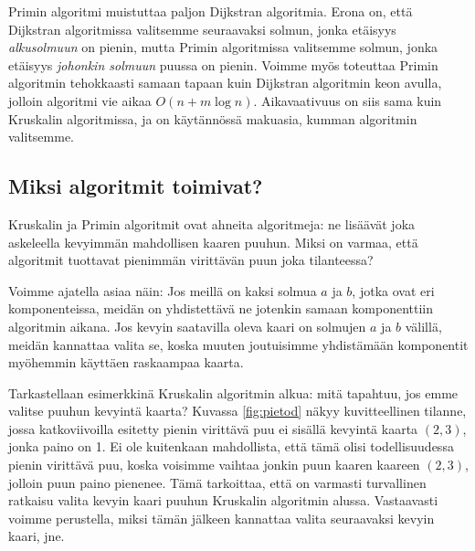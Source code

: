 Primin algoritmi muistuttaa paljon Dijkstran algoritmia.
Erona on, että Dijkstran algoritmissa valitsemme
seuraavaksi solmun, jonka etäisyys \emph{alkusolmuun} on pienin,
mutta Primin algoritmissa valitsemme solmun, jonka etäisyys
\emph{johonkin solmuun} puussa on pienin.
Voimme myös toteuttaa Primin algoritmin tehokkaasti samaan
tapaan kuin Dijkstran algoritmin keon avulla,
jolloin algoritmi vie aikaa $O(n+m \log n)$.
Aikavaativuus on siis sama kuin Kruskalin algoritmissa,
ja on käytännössä makuasia, kumman algoritmin valitsemme.

\subsection{Miksi algoritmit toimivat?}

Kruskalin ja Primin algoritmit ovat ahneita algoritmeja:
ne lisäävät joka askeleella kevyimmän mahdollisen kaaren puuhun.
Miksi on varmaa, että algoritmit tuottavat pienimmän virittävän
puun joka tilanteessa?

Voimme ajatella asiaa näin: 
Jos meillä on kaksi solmua $a$ ja $b$, jotka ovat eri komponenteissa,
meidän on yhdistettävä ne jotenkin samaan komponenttiin algoritmin aikana.
Jos kevyin saatavilla oleva kaari on solmujen $a$ ja $b$ välillä,
meidän kannattaa valita se, koska muuten joutuisimme yhdistämään komponentit
myöhemmin käyttäen raskaampaa kaarta.

Tarkastellaan esimerkkinä Kruskalin algoritmin alkua:
mitä tapahtuu, jos emme valitse puuhun kevyintä kaarta?
Kuvassa \ref{fig:pietod} näkyy kuvitteellinen tilanne,
jossa katkoviivoilla esitetty pienin virittävä puu ei sisällä
kevyintä kaarta $(2,3)$, jonka paino on 1.
Ei ole kuitenkaan mahdollista, että tämä olisi todellisuudessa
pienin virittävä puu, koska voisimme vaihtaa jonkin puun kaaren
kaareen $(2,3)$, jolloin puun paino pienenee.
Tämä tarkoittaa, että on varmasti turvallinen ratkaisu valita
kevyin kaari puuhun Kruskalin algoritmin alussa.
Vastaavasti voimme perustella, miksi tämän jälkeen kannattaa
valita seuraavaksi kevyin kaari, jne.

